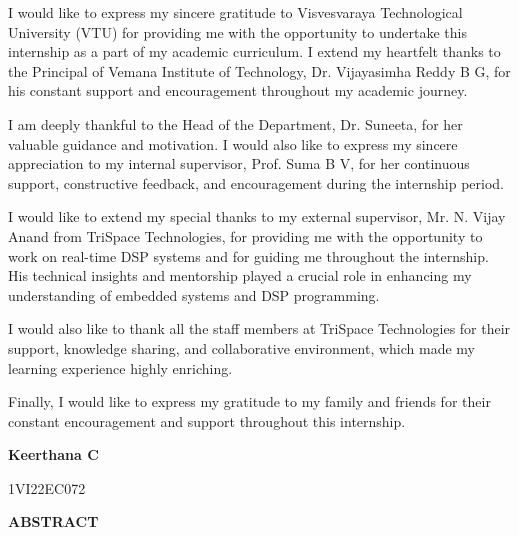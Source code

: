 \documentclass[12pt,a4paper]{report}
\begin{document}
\vspace{0.5cm}
\setlength{\parskip}{1em}
\begin{onehalfspacing}

I would like to express my sincere gratitude to Visvesvaraya Technological University (VTU) for providing me with the opportunity to undertake this internship as a part of my academic curriculum. I extend my heartfelt thanks to the Principal of Vemana Institute of Technology, Dr. Vijayasimha Reddy B G, for his constant support and encouragement throughout my academic journey.


I am deeply thankful to the Head of the Department, Dr. Suneeta, for her valuable guidance and motivation. I would also like to express my sincere appreciation to my internal supervisor, Prof. Suma B V, for her continuous support, constructive feedback, and encouragement during the internship period.


I would like to extend my special thanks to my external supervisor, Mr. N. Vijay Anand from TriSpace Technologies, for providing me with the opportunity to work on real-time DSP systems and for guiding me throughout the internship. His technical insights and mentorship played a crucial role in enhancing my understanding of embedded systems and DSP programming.


I would also like to thank all the staff members at TriSpace Technologies for their support, knowledge sharing, and collaborative environment, which made my learning experience highly enriching.


Finally, I would like to express my gratitude to my family and friends for their constant encouragement and support throughout this internship.

\end{onehalfspacing}
\setlength{\parskip}{0.4em}

\vspace{1cm}
\begin{flushright}
\textbf{Keerthana C}\par
1VI22EC072\par
\end{flushright}

\newpage
\begin{center}
{\LARGE \textbf{ABSTRACT}\par}
\end{center}
\end{document}
